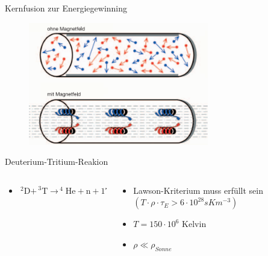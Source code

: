 \documentclass[aspectratio=169,xcolor=dvipsnames,14pt]{beamer}
\begin{document}
\begin{frame}{Kernfusion zur Energiegewinning}
    \begin{figure}
        \centering
        \includegraphics[width=0.7\textwidth]{Images/PlasmaImMagnetfeld.png}
    \end{figure}
\end{frame}
    
    \begin{frame}{Deuterium-Tritium-Reakion}
        \begin{columns}
            \begin{column}{0.7\textwidth}
                \begin{itemize}
                    \color{LightGrey}
                    \item
                    \begin{math} 
                            {\displaystyle \mathrm {_{\ }^{\ 2}D+_{\ }^{\ 3}T\to _{\ }^{\ 4}He+n + 17.58 \ MeV}}
                    \end{math}
                \end{itemize}
            \end{column}

            \begin{column}{0.3\textwidth}
                \begin{itemize}
                \color{LightGrey}
                    \item Lawson-Kriterium muss erfüllt sein $(T\cdot\rho\cdot\tau _{E} > 6\cdot{10}^{28}sK{m}^{-3})$
                    \item $T = 150\cdot{10}^{6}$ Kelvin
                    \item $\rho \ll \rho_{Sonne}$
                \end{itemize}
            \end{column}

        \end{columns}
    \end{frame}
\end{document}
